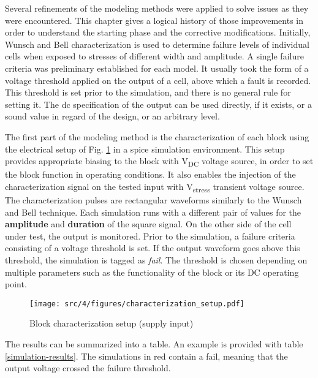 Several refinements of the modeling methods were applied to solve issues as they were encountered.
This chapter gives a logical history of those improvements in order to understand the starting phase and the corrective modifications.
Initially, Wunsch and Bell characterization \cite{wunsch-bell} is used to determine failure levels of individual cells when exposed to stresses of different width and amplitude.
A single failure criteria was preliminary established for each model.
It usually took the form of a voltage threshold applied on the output of a cell, above which a fault is recorded.
This threshold is set prior to the simulation, and there is no general rule for setting it.
The \gls{dc} specification of the output can be used directly, if it exists, or a sound value in regard of the design, or an arbitrary level.

The first part of the modeling method is the characterization of each block using the electrical setup of Fig. \ref{block_function_cz} in a \gls{spice} simulation environment.
This setup provides appropriate biasing to the block with V\textsubscript{DC} voltage source, in order to set the block function in operating conditions.
It also enables the injection of the characterization signal on the tested input with V\textsubscript{stress} transient voltage source.
The characterization pulses are rectangular waveforms similarly to the Wunsch and Bell technique.
Each simulation runs with a different pair of values for the \textbf{amplitude} and \textbf{duration} of the square signal.
On the other side of the cell under test, the output is monitored.
Prior to the simulation, a failure criteria consisting of a voltage threshold is set.
If the output waveform goes above this threshold, the simulation is tagged as \textit{fail}.
The threshold is chosen depending on multiple parameters such as the functionality of the block or its DC operating point.

\begin{figure}[!h]
  \centering
  \texttt{[image: src/4/figures/characterization\_setup.pdf]}
  \caption{Block characterization setup (supply input)}
  \label{block_function_cz}
\end{figure}

The results can be summarized into a table.
An example is provided with table \ref{simulation-results}.
The simulations in red contain a fail, meaning that the output voltage crossed the failure threshold.

